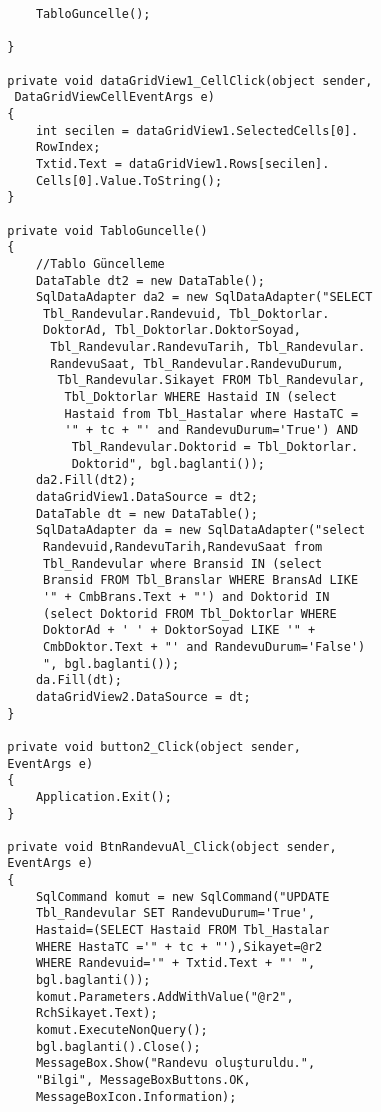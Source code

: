 \begin{lstlisting}
            TabloGuncelle();

        }

        private void dataGridView1_CellClick(object sender,
         DataGridViewCellEventArgs e)
        {
            int secilen = dataGridView1.SelectedCells[0].
            RowIndex;
            Txtid.Text = dataGridView1.Rows[secilen].
            Cells[0].Value.ToString();
        }

        private void TabloGuncelle()
        {
            //Tablo Güncelleme
            DataTable dt2 = new DataTable();
            SqlDataAdapter da2 = new SqlDataAdapter("SELECT
             Tbl_Randevular.Randevuid, Tbl_Doktorlar.
             DoktorAd, Tbl_Doktorlar.DoktorSoyad,
              Tbl_Randevular.RandevuTarih, Tbl_Randevular.
              RandevuSaat, Tbl_Randevular.RandevuDurum,
               Tbl_Randevular.Sikayet FROM Tbl_Randevular,
                Tbl_Doktorlar WHERE Hastaid IN (select 
                Hastaid from Tbl_Hastalar where HastaTC = 
                '" + tc + "' and RandevuDurum='True') AND
                 Tbl_Randevular.Doktorid = Tbl_Doktorlar.
                 Doktorid", bgl.baglanti());
            da2.Fill(dt2);
            dataGridView1.DataSource = dt2;
            DataTable dt = new DataTable();
            SqlDataAdapter da = new SqlDataAdapter("select
             Randevuid,RandevuTarih,RandevuSaat from 
             Tbl_Randevular where Bransid IN (select 
             Bransid FROM Tbl_Branslar WHERE BransAd LIKE 
             '" + CmbBrans.Text + "') and Doktorid IN 
             (select Doktorid FROM Tbl_Doktorlar WHERE 
             DoktorAd + ' ' + DoktorSoyad LIKE '" + 
             CmbDoktor.Text + "' and RandevuDurum='False') 
             ", bgl.baglanti());
            da.Fill(dt);
            dataGridView2.DataSource = dt;
        }

        private void button2_Click(object sender, 
        EventArgs e)
        {
            Application.Exit();
        }

        private void BtnRandevuAl_Click(object sender, 
        EventArgs e)
        {
            SqlCommand komut = new SqlCommand("UPDATE 
            Tbl_Randevular SET RandevuDurum='True',
            Hastaid=(SELECT Hastaid FROM Tbl_Hastalar 
            WHERE HastaTC ='" + tc + "'),Sikayet=@r2 
            WHERE Randevuid='" + Txtid.Text + "' ", 
            bgl.baglanti());
            komut.Parameters.AddWithValue("@r2", 
            RchSikayet.Text);
            komut.ExecuteNonQuery();
            bgl.baglanti().Close();
            MessageBox.Show("Randevu oluşturuldu.", 
            "Bilgi", MessageBoxButtons.OK, 
            MessageBoxIcon.Information);


\end{lstlisting}
